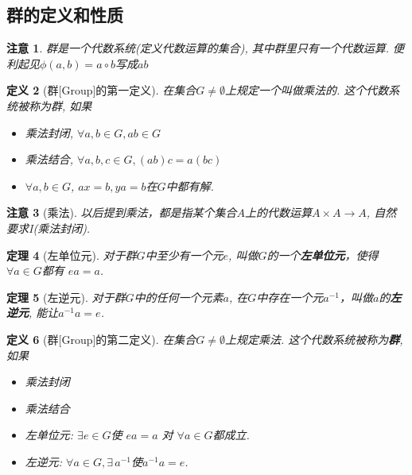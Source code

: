 \documentclass[UTF8]{ctexart}
\newtheorem{Definition}{定义}%
\newtheorem{Theorem}[Definition]{定理}
\newtheorem{Remark}[Definition]{注意}
\begin{document}
\subsection{群的定义和性质}

\begin{Remark}
群是一个代数系统(定义代数运算的集合), 其中群里只有一个代数运算. 便利起见$\phi(a, b) = a \circ b$写成$a b$
\end{Remark}

\begin{Definition}[群\mbox{[Group]}的第一定义]
在集合$G \neq \emptyset$上规定一个叫做乘法的\;\;. 这个代数系统被称为群, 如果
\begin{itemize}
	\item[\uppercase\expandafter{\romannumeral1}] 乘法封闭, $\forall a, b \in G, ab \in G$
	\item[\uppercase\expandafter{\romannumeral2}] 乘法结合, $\forall a, b, c \in G, (ab)c = a(bc)$
	\item[\uppercase\expandafter{\romannumeral3}] $ \forall a, b \in G$, $ax = b, ya = b$在$G$中都有解.
\end{itemize}
\end{Definition}

\begin{Remark}[乘法]
以后提到乘法，都是指某个集合$A$上的代数运算$A \times A \rightarrow A$, 自然要求I(乘法封闭).
\end{Remark}


\begin{Theorem}[左单位元]
对于群$G$中至少有一个元$e$, 叫做$G$的一个\textbf{左单位元}，使得$\forall a \in G$都有 $ea = a$.
\end{Theorem}

\begin{Theorem}[左逆元]
对于群$G$中的任何一个元素$a$, 在$G$中存在一个元$a^{-1}$，叫做$a$的\textbf{左逆元}, 能让$a^{-1} a = e$.
\end{Theorem}

\begin{Definition}[群\mbox{[Group]}的第二定义]
在集合$G \neq \emptyset$上规定乘法. 这个代数系统被称为\textbf{群}, 如果
\begin{itemize}
	\item[\uppercase\expandafter{\romannumeral1}] 乘法封闭
	\item[\uppercase\expandafter{\romannumeral2}] 乘法结合
	\item[IV] 左单位元: $\exists e \in G$使 $ea =a$ 对 $\forall a \in G$都成立.
	\item[V] 左逆元: $\forall a \in G, \exists \, a^{-1}$使$a^{-1}a = e$.
\end{itemize}
\end{Definition}
\end{document}
